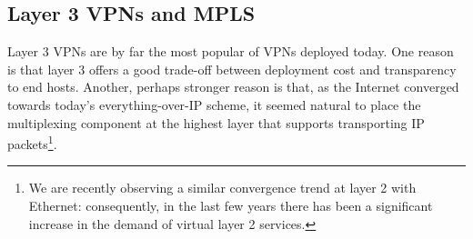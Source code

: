 \documentclass{article}
\begin{document}

\subsection{Layer 3 VPNs and MPLS} \label{sec:intro-goals}
Layer 3 VPNs are by far the most popular of VPNs deployed today.  One reason is that layer 3 offers a good trade-off 
between deployment cost and transparency to end hosts. Another, perhaps stronger 
reason is that, as the Internet converged towards today's everything-over-IP 
scheme, it seemed natural to place the multiplexing component at the highest 
layer that supports transporting IP packets\footnote{We are recently observing a 
similar convergence trend at layer 2 with Ethernet: consequently, in the last 
few years there has been a significant increase in the demand of virtual layer 2 
services.}.
\end{document}
